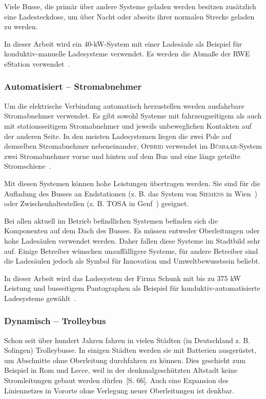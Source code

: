 Viele Busse, die primär über andere Systeme geladen werden besitzen zusätzlich eine Ladesteckdose, um über Nacht oder abseits ihrer normalen Strecke geladen zu werden.

In dieser Arbeit wird ein 40-kW-System mit einer Ladesäule als Beispiel für konduktiv-manuelle Ladesysteme verwendet. Es werden die Abmaße der RWE eStation verwendet~\cite{rweKonMan}.

\subsubsection{Automatisiert – Stromabnehmer}
Um die elektrische Verbindung automatisch herzustellen werden ausfahrbare Stromabnehmer verwendet. Es gibt sowohl Systeme mit fahrzeugseitigem als auch mit stationsseitigem Stromabnehmer und jeweils unbeweglichen Kontakten auf der anderen Seite. In den meisten Ladesystemen liegen die zwei Pole auf demselben Stromabnehmer nebeneinander, \textsc{Opbrid} verwendet im \textsc{Bůsbaar}-System zwei Stromabnehmer vorne und hinten auf dem Bus und eine längs geteilte Stromschiene~\cite{SchKonLade}.

Mit diesen Systemen können hohe Leistungen übertragen werden. Sie sind für die Aufladung des Busses an Endstationen (z. B. das System von \textsc{Siemens} in Wien~\cite{SiemensWien}) oder Zwischenhaltestellen (z. B. \textsc{TOSA} in Genf~\cite{tosa}) geeignet. 

Bei allen aktuell im Betrieb befindlichen Systemen befinden sich die Komponenten auf dem Dach des Busses. Es müssen entweder Oberleitungen oder hohe Ladesäulen verwendet werden. Daher fallen diese Systeme im Stadtbild sehr auf. Einige Betreiber wünschen unauffälligere Systeme, für andere Betreiber sind die Ladesäulen jedoch als Symbol für Innovation und Umweltbewusstsein beliebt.

In dieser Arbeit wird das Ladesystem der Firma Schunk mit bis zu 375 kW Leistung und busseitigem Pantographen als Beispiel für konduktiv-automatisierte Ladesysteme gewählt~\cite{Weigel:2013}.

\subsubsection{Dynamisch – Trolleybus} 
Schon seit über hundert Jahren fahren in vielen Städten (in Deutschland z. B. Solingen) Trolleybusse. In einigen Städten werden sie mit Batterien ausgerüstet, um Abschnitte ohne Oberleitung durchfahren zu können. Dies geschieht zum Beispiel in Rom und Lecce, weil in der denkmalgeschützten Altstadt keine Stromleitungen gebaut werden dürfen~\cite{tub_aleph001746639}[S. 66]. Auch eine Expansion des Liniennetzes in Vororte ohne Verlegung neuer Oberleitungen ist denkbar.

